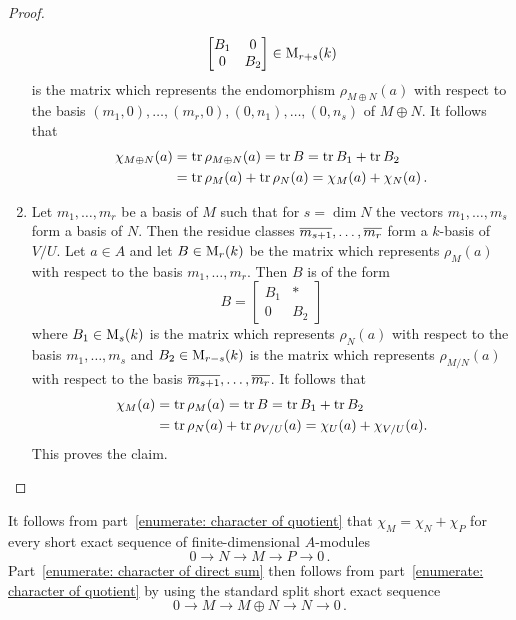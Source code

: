 \begin{proof}
\begin{enumerate}
\[\begin{bmatrix}
                    B_1 & 0 \\
                    0   & B_2
                  \end{bmatrix}
        \in       \operatorname{M}_{r+s}(k)
      \]
      is the matrix which represents the endomorphism $\rho_{M \oplus N}(a)$ with respect to the basis $(m_1, 0), \dotsc, (m_r, 0), (0, n_1), \dotsc, (0, n_s)$ of $M \oplus N$.
      It follows that
      \begin{align*}
            \chi_{M \oplus N}(a)
        &=  \operatorname{tr} \rho_{M \oplus N}(a)
         =  \operatorname{tr} B
         =  \operatorname{tr} B_1 + \operatorname{tr} B_2 \\
        &=  \operatorname{tr} \rho_M(a) + \operatorname{tr} \rho_N(a)
         =  \chi_M(a) + \chi_N(a) \,.
      \end{align*}
    \item
      Let $m_1, \dotsc, m_r$ be a basis of $M$ such that for $s = \dim N$ the vectors $m_1, \dotsc, m_s$ form a basis of $N$.
      Then the residue classes $\overline{m_{s+1}}, \dotsc, \overline{m_r}$ form a $k$-basis of $V/U$.
      Let $a \in A$ and let $B \in \operatorname{M}_r(k)$ be the matrix which represents $\rho_M(a)$ with respect to the basis $m_1, \dotsc, m_r$.
      Then $B$ is of the form
      \[
          B
        = \begin{bmatrix}
            B_1 & * \\
            0 & B_2
          \end{bmatrix}
      \]
      where $B_1 \in \operatorname{M}_s(k)$ is the matrix which represents $\rho_N(a)$ with respect to the basis $m_1, \dotsc, m_s$ and $B_2 \in \operatorname{M}_{r-s}(k)$ is the matrix which represents $\rho_{M/N}(a)$ with respect to the basis $\overline{m_{s+1}}, \dotsc, \overline{m_r}$.
      It follows that
      \begin{align*}
            \chi_M(a)
        &=  \operatorname{tr} \rho_M(a)
         =  \operatorname{tr} B
         =  \operatorname{tr} B_1 + \operatorname{tr} B_2 \\
        &=  \operatorname{tr} \rho_N(a) + \operatorname{tr} \rho_{V/U}(a)
         =  \chi_U(a) + \chi_{V/U}(a).
      \end{align*}
      This proves the claim.
    \qedhere
  \end{enumerate}
\end{proof}


\begin{remark}
  It follows from part~\ref*{enumerate: character of quotient} that $\chi_M = \chi_N + \chi_P$ for every short exact sequence of finite-dimensional $A$-modules
  \[
        0
    \to N
    \to M
    \to P
    \to 0 \,.
  \]
  Part~\ref*{enumerate: character of direct sum} then follows from part~\ref*{enumerate: character of quotient} by using the standard split short exact sequence
  \[
        0
    \to M
    \to M \oplus N
    \to N
    \to 0 \,.
  \]
\end{remark}


